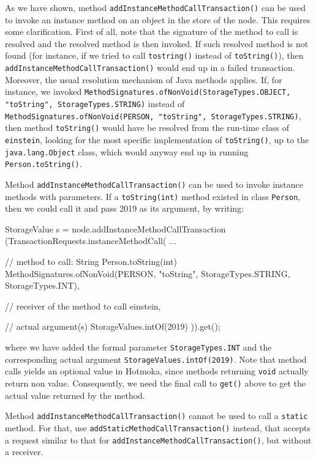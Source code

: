 As we have shown, method \texttt{addInstanceMethodCallTransaction()} can be used to
invoke an instance method on an object in the store of the node. This requires some
clarification. First of all, note that the signature of the method to
call is resolved and the resolved method is then invoked. If
such resolved method is not found (for instance, if we tried to call \texttt{tostring()} instead
of \texttt{toString()}), then \texttt{addInstanceMethodCallTransaction()} would end up in
a failed transaction. Moreover, the usual resolution mechanism of Java methods applies.
If, for instance, we invoked
\texttt{MethodSignatures.ofNonVoid(StorageTypes.OBJECT, "toString", StorageTypes.STRING)}
instead of
\texttt{MethodSignatures.ofNonVoid(PERSON, "toString", StorageTypes.STRING)},
then method \texttt{toString()} would have be resolved from the run-time class of
\texttt{einstein}, looking for the most specific implementation of \texttt{toString()},
up to the \texttt{java.lang.Object} class, which would anyway end up in
running \texttt{Person.toString()}.

Method \texttt{addInstanceMethodCallTransaction()} can be used to invoke instance
methods with parameters. If a \texttt{toString(int)} method existed in class \texttt{Person},
then we could call it and pass 2019 as its argument, by writing:
%
\begin{codebox}\begin{javalst}
StorageValue s = node.addInstanceMethodCallTransaction
(TransactionRequests.instanceMethodCall(
...

// method to call: String Person.toString(int)
MethodSignatures.ofNonVoid(PERSON, "toString", StorageTypes.STRING, StorageTypes.INT),

// receiver of the method to call
einstein,
  
// actual argument(s)
StorageValues.intOf(2019)
)).get();
\end{javalst}\end{codebox}
%
where we have added the formal parameter \texttt{StorageTypes.INT}
and the corresponding
actual argument \texttt{StorageValues.intOf(2019)}. Note that method calls yields
an optional value in Hotmoka, since methods returning \texttt{void} actually return non value.
Consequently, we need the final call to \texttt{get()} above to get the actual
value returned by the method.

Method \texttt{addInstanceMethodCallTransaction()} cannot be used to call a \texttt{static}
method. For that, use \texttt{addStaticMethodCallTransaction()} instead, that accepts
a request similar to that for \texttt{addInstanceMethodCallTransaction()}, but without a receiver.

